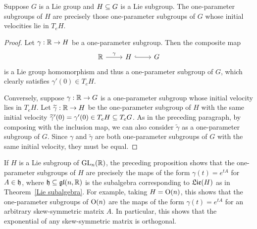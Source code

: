 \begin{proposition}\label{one-para Lie subgroup}
Suppose $G$ is a Lie group and $H\subseteq G$ is a Lie subgroup. The one-parameter subgroups of $H$ are precisely those one-parameter subgroups of $G$ whose initial velocities lie in $T_eH$.
\end{proposition}
\begin{proof}
Let $\gamma:\mathbb{R}\to H$ be a one-parameter subgroup. Then the composite map
\[\begin{tikzcd}
\R\ar[r,"\gamma"]&H\ar[r,hook]&G
\end{tikzcd}\]
is a Lie group homomorphism and thus a one-parameter subgroup of $G$, which clearly satisfies $\gamma'(0)\in T_eH$.\par
Conversely, suppose $\gamma:\mathbb{R}\to G$ is a one-parameter subgroup whose initial velocity lies in $T_eH$. Let $\widetilde{\gamma}:\mathbb{R}\to H$ be the one-parameter subgroup of $H$ with the same initial velocity $\widetilde{\gamma}'(0)=\gamma'(0)\in T_eH\subseteq T_eG$. As in the preceding paragraph, by composing with the inclusion map, we can also consider $\widetilde{\gamma}$ as a one-parameter subgroup of $G$. Since $\gamma$ and $\widetilde{\gamma}$ are both one-parameter subgroups of $G$ with the same initial velocity, they must be equal.
\end{proof}
\begin{example}
If $H$ is a Lie subgroup of $\mathrm{GL}_n(\mathbb{R})$, the preceding proposition shows that the one-parameter subgroups of $H$ are precisely the maps of the form $\gamma(t)=e^{tA}$ for $A\in\mathfrak{h}$, where $\mathfrak{h}\subseteq\mathfrak{gl}(n,\mathbb{R})$ is the subalgebra corresponding to $\mathfrak{Lie}(H)$ as in Theorem~\ref{Lie subalgebra}. For example, taking $H=\mathrm{O}(n)$, this shows that the one-parameter subgroups of $\mathrm{O}(n)$ are the maps of the form $\gamma(t)=e^{tA}$ for an arbitrary skew-symmetric matrix $A$. In particular, this shows that the exponential of any skew-symmetric matrix is orthogonal.
\end{example}
